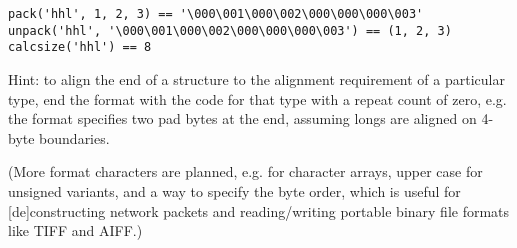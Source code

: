 \bcode\begin{verbatim}
pack('hhl', 1, 2, 3) == '\000\001\000\002\000\000\000\003'
unpack('hhl', '\000\001\000\002\000\000\000\003') == (1, 2, 3)
calcsize('hhl') == 8
\end{verbatim}\ecode

Hint: to align the end of a structure to the alignment requirement of
a particular type, end the format with the code for that type with a
repeat count of zero, e.g. the format  specifies two
pad bytes at the end, assuming longs are aligned on 4-byte boundaries.

(More format characters are planned, e.g.  for character
arrays, upper case for unsigned variants, and a way to specify the
byte order, which is useful for [de]constructing network packets and
reading/writing portable binary file formats like TIFF and AIFF.)
